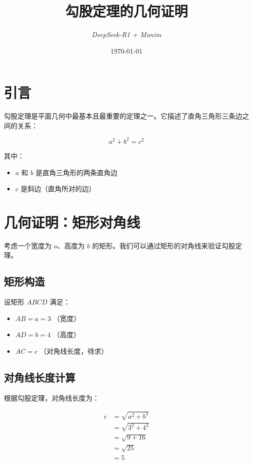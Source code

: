 \documentclass[12pt]{article}
\title{\textbf{\Lsquare 勾股定理的几何证明}}
\author{\textit{DeepSeek-R1 + Manim}}
\date{\today}
\begin{document}
\maketitle

\section{引言}

勾股定理是平面几何中最基本且最重要的定理之一。它描述了直角三角形三条边之间的关系：

\begin{equation}
\label{eq:pythagorean}
a^2 + b^2 = c^2
\end{equation}

其中：
\begin{itemize}
    \item $a$ 和 $b$ 是直角三角形的两条直角边
    \item $c$ 是斜边（直角所对的边）
\end{itemize}

\section{几何证明：矩形对角线}

考虑一个宽度为 $a$、高度为 $b$ 的矩形。我们可以通过矩形的对角线来验证勾股定理。

\subsection{矩形构造}

设矩形 $ABCD$ 满足：
\begin{itemize}
    \item $AB = a = 3$ （宽度）
    \item $AD = b = 4$ （高度）
    \item $AC = c$ （对角线长度，待求）
\end{itemize}

\subsection{对角线长度计算}

根据勾股定理，对角线长度为：

\begin{align}
c &= \sqrt{a^2 + b^2} \\
  &= \sqrt{3^2 + 4^2} \\
  &= \sqrt{9 + 16} \\
  &= \sqrt{25} \\
  &= 5
\end{align}
\end{document}
